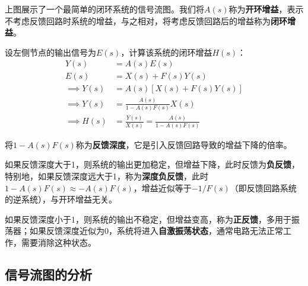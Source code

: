 上图展示了一个最简单的闭环系统的信号流图。我们将$A(s)$称为\textbf{开环增益}，表示不考虑反馈回路时系统的增益，与之相对，将考虑反馈回路后的增益称为\textbf{闭环增益}。

设左侧节点的输出信号为$E(s)$，计算该系统的闭环增益$H(s)$：
\begin{align*}
    Y(s)&=A(s)E(s)\\
    E(s)&=X(s)+F(s)Y(s)\\
    \implies Y(s)&=A(s)\left[X(s)+F(s)Y(s)\right]\\
    \implies Y(s)&=\frac{A(s)}{1-A(s)F(s)}X(s)\\
    \implies H(s)&=\frac{Y(s)}{X(s)}=\frac{A(s)}{1-A(s)F(s)}
\end{align*}

\begin{definition}[反馈深度与反馈类型]
将$1-A(s)F(s)$称为\textbf{反馈深度}，它是引入反馈回路导致的增益下降的倍率。

如果反馈深度大于1，则系统的输出更加稳定，但增益下降，此时反馈为\textbf{负反馈}，特别地，如果反馈深度远大于1，称为\textbf{深度负反馈}，此时$1-A(s)F(s)\approx -A(s)F(s)$，增益近似等于$-1/F(s)$（即反馈回路系统的逆系统），与开环增益无关。

如果反馈深度小于1，则系统的输出不稳定，但增益变高，称为\textbf{正反馈}，多用于振荡器；如果反馈深度近似为0，系统将进入\textbf{自激振荡状态}，通常电路无法正常工作，需要消除这种状态。
\end{definition}

\subsection{信号流图的分析}\label{sub:signal_flow_graph}

